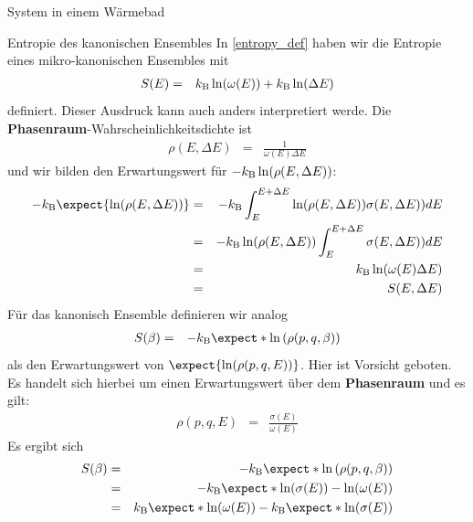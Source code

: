 \begin{chapter}{\titlestr}
\begin{section}{System in einem Wärmebad}
\begin{subsection}{Entropie des kanonischen Ensembles}
In \ref{entropy_def} haben wir die Entropie eines mikro-kanonischen Ensembles mit
\begin{eqnarray*}
S(E) &=& k_{\mathrm{B}} \ln(\omega(E))+k_{\mathrm{B}} \ln(\Delta E)
\end{eqnarray*}
definiert. Dieser Ausdruck kann auch anders interpretiert werde. Die \textbf{Phasenraum}-Wahrscheinlichkeitsdichte ist
\begin{eqnarray*}
\rho(E,\Delta E)&=&\frac{1}{\omega(E)\Delta E}
\end{eqnarray*}
und wir bilden den Erwartungswert für $-k_{\mathrm{B}} \ln(\rho(E,\Delta E))$:
\begin{eqnarray*}
-\kb \expect{\ln(\rho(E,\Delta E))} &=& -\kb \int_E^{E+\Delta E} \ln(\rho(E,\Delta E)) \sigma(E,\Delta E)) dE\\
&=& -\kb \ln(\rho(E,\Delta E)) \int_E^{E+\Delta E} \sigma(E,\Delta E)) dE\\
&=& \kb \ln(\omega(E)\Delta E)\\
&=& S(E,\Delta E)
\end{eqnarray*}
Für das kanonisch Ensemble definieren wir analog
\begin{eqnarray*}
S(\beta) &=& -\kb \expect*{\ln\left(\rho(p,q,\beta)\right)}
\end{eqnarray*}
als den Erwartungswert von $\expect{\ln(\rho(p,q,E))}$.
Hier ist Vorsicht geboten. Es handelt sich hierbei um einen Erwartungswert über dem \textbf{Phasenraum} und es gilt:
\begin{eqnarray*}
\rho(p,q,E) &=& \frac{\sigma(E)}{\omega(E)}
\end{eqnarray*}
Es ergibt sich
\begin{eqnarray}
\label{S_canonic}
S(\beta) &=& -\kb \expect*{\ln\left(\rho(p,q,\beta)\right)}\cr
&=& -\kb \expect*{\ln(\sigma(E))-\ln(\omega(E))}\cr
&=& \kb \expect*{\ln(\omega(E))}-\kb \expect*{\ln(\sigma(E))}
\end{eqnarray}
\end{subsection}


\end{section}
\end{chapter}
